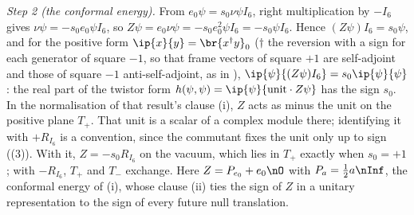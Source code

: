 \emph{Step 2 (the conformal energy).} From $e_{0}\psi = s_{0}\nu\psi I_{6}$, right multiplication by $-I_{6}$ gives $\nu\psi = -s_{0}e_{0}\psi I_{6}$, so $Z\psi = e_{0}\nu\psi = -s_{0}e_{0}^{2}\psi I_{6} = -s_{0}\psi I_{6}$. Hence $(Z\psi)I_{6} = s_{0}\psi$, and for the positive form $\ip{x}{y} = \br{x^{\dagger}y}_{0}$ ($\dagger$ the reversion with a sign for each generator of square $-1$, so that frame vectors of square $+1$ are self-adjoint and those of square $-1$ anti-self-adjoint, as in ), $\ip{\psi}{(Z\psi)I_{6}} = s_{0}\ip{\psi}{\psi}$: the real part of the twistor form $h(\psi, \psi) = \ip{\psi}{\mathrm{unit}\cdot Z\psi}$ has the sign $s_{0}$. In the normalisation of that result's clause (i), $Z$ acts as minus the unit on the positive plane $T_{+}$. That unit is a scalar of a complex module there; identifying it with $+R_{I_{6}}$ is a convention, since the commutant fixes the unit only up to sign ((3)). With it, $Z = -s_{0}R_{I_{6}}$ on the vacuum, which lies in $T_{+}$ exactly when $s_{0} = +1$; with $-R_{I_{6}}$, $T_{+}$ and $T_{-}$ exchange. Here $Z = P_{e_{0}} + e_{0}\nO$ with $P_{a} = \tfrac12 a\nInf$, the conformal energy of (i), whose clause (ii) ties the sign of $Z$ in a unitary representation to the sign of every future null translation.

